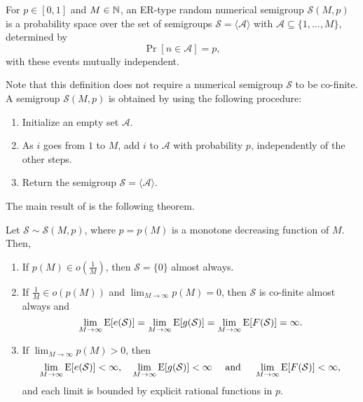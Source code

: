 \begin{definition}
    For $p \in [0, 1]$ and $M \in \mathbb{N}$, an ER-type random numerical semigroup $\mathcal{S}(M, p)$ is a probability space over the set of semigroups $\mathcal{S} = \langle\mathcal{A}\rangle$ with $\mathcal{A} \subseteq \{1,...,M\}$, determined by
    \[\Pr[n \in \mathcal{A}] = p,\]
    with these events mutually independent.
\end{definition}
Note that this definition does not require a numerical semigroup $\mathcal{S}$ to be co-finite. A semigroup $\mathcal{S}(M, p)$ is obtained by using the following procedure:
\begin{enumerate}
    \item Initialize an empty set $\mathcal{A}$.
    \item As $i$ goes from $1$ to $M$, add $i$ to $\mathcal{A}$ with probability $p$, independently of the other steps.
    \item Return the semigroup $\mathcal{S} = \langle\mathcal{A}\rangle$.
\end{enumerate}

The main result of \cite{de2018random} is the following theorem.  

\begin{theorem}\label{thm:ermodel} Let $\mathcal{S} \sim \mathcal{S}(M, p)$, where $p = p(M)$ is a monotone decreasing function of $M$. Then, 
    \begin{enumerate}[label=(\alph*)]
        \item If $p(M) \in o\left(\frac{1}{M}\right)$, then $\mathcal{S} = \{0\}$ almost always.
        \item If $\frac{1}{M} \in o(p(M))$ and $\lim_{M \to \infty} p(M)= 0$, then $\mathcal{S}$ is co-finite almost always and
         \[\lim_{M \to  \infty} \mathrm{E}[e(\mathcal{S})] = \lim_{M \to \infty} \mathrm{E}[g(\mathcal{S})] = \lim_{M \to \infty} \mathrm{E}[F(\mathcal{S})] = \infty.\]
        \item If $\lim_{M \to \infty} p(M) > 0$, then
        \[\lim_{M \to \infty} \mathrm{E}[e(\mathcal{S})] < \infty,  \quad \lim_{M \to \infty} \mathrm{E}[g(\mathcal{S})] < \infty \quad  \text{ and } \quad \lim_{M \to \infty} \mathrm{E}[F(\mathcal{S})]< \infty,\]
        and each limit is bounded by explicit rational functions in $p$.
    \end{enumerate}
\end{theorem}

